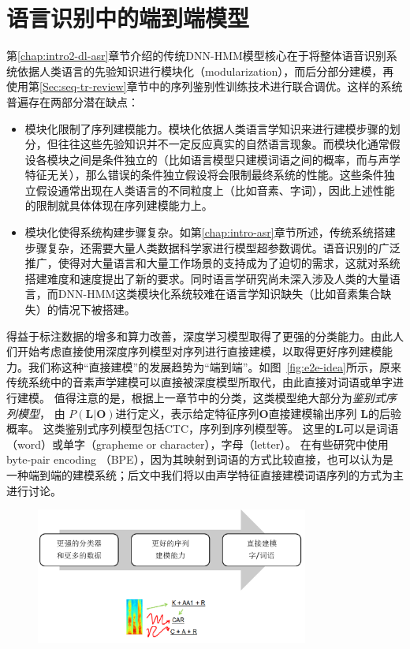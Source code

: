 \section{语言识别中的端到端模型}
\label{chap:intro2-e2e}

第\ref{chap:intro2-dl-asr}章节介绍的传统DNN-HMM模型核心在于将整体语音识别系统依据人类语言的先验知识进行模块化（modularization），而后分部分建模，再使用第\ref{Sec:seq-tr-review}章节中的序列鉴别性训练技术进行联合调优。这样的系统普遍存在两部分潜在缺点：
\begin{itemize}
    \item 模块化限制了序列建模能力。模块化依据人类语言学知识来进行建模步骤的划分，但往往这些先验知识并不一定反应真实的自然语言现象。而模块化通常假设各模块之间是条件独立的（比如语言模型只建模词语之间的概率，而与声学特征无关），那么错误的条件独立假设将会限制最终系统的性能。这些条件独立假设通常出现在人类语言的不同粒度上（比如音素、字词），因此上述性能的限制就具体体现在序列建模能力上。
    \item 模块化使得系统构建步骤复杂。如第\ref{chap:intro-asr}章节所述，传统系统搭建步骤复杂，还需要大量人类数据科学家进行模型超参数调优。语音识别的广泛推广，使得对大量语言和大量工作场景的支持成为了迫切的需求，这就对系统搭建难度和速度提出了新的要求。同时语言学研究尚未深入涉及人类的大量语言，而DNN-HMM这类模块化系统较难在语言学知识缺失（比如音素集合缺失）的情况下被搭建。
\end{itemize}

得益于标注数据的增多和算力改善，深度学习模型取得了更强的分类能力。由此人们开始考虑直接使用深度序列模型对序列进行直接建模，以取得更好序列建模能力。我们称这种“直接建模”的发展趋势为“端到端”。如图~\ref{fig:e2e-idea}所示，原来传统系统中的音素声学建模可以直接被深度模型所取代，由此直接对词语或单字进行建模。
值得注意的是，根据上一章节中的分类，这类模型绝大部分为{\em 鉴别式序列模型}， 由 $P(\mathbf{L}|\mathbf{O})$进行定义，表示给定特征序列$\mathbf{O}$直接建模输出序列 $\mathbf{L}$的后验概率。
这类鉴别式序列模型包括CTC，序列到序列模型等。
这里的$\mathbf{L}$可以是词语（word）或单字（grapheme or character），字母（letter）。
在有些研究中使用byte-pair encoding （BPE），因为其映射到词语的方式比较直接，也可以认为是一种端到端的建模系统；后文中我们将以由声学特征直接建模词语序列的方式为主进行讨论。

\begin{figure}[!htp]
  \centering
    \captionstyle{\centering}
    \includegraphics[clip=true, width=0.8\textwidth]{figure/e2e-idea.png}
\end{figure}



